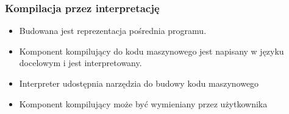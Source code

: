 \begin{frame}
	\frametitle{Kompilacja przez interpretację}

	\begin{itemize}
		\item Budowana jest reprezentacja pośrednia programu.
		\item Komponent kompilujący do kodu maszynowego jest napisany w języku docelowym i jest interpretowany.
		\item Interpreter udostępnia narzędzia do budowy kodu maszynowego
		\item Komponent kompilujący może być wymieniany przez użytkownika
	\end{itemize}

\end{frame}

